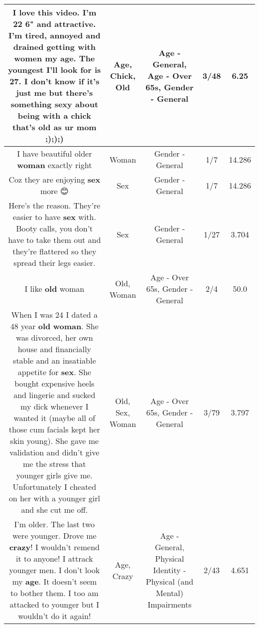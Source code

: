 \documentclass[11pt]{article}
\newlength\mylength
\begin{document}
\begin{center}
\begin{longtable}{|C{.65\mylength}|C{.30\mylength}|C{.12\mylength}|C{.12\mylength}|C{.12\mylength}|}
  \small I love this video. I'm 22 6" and attractive. I'm tired, annoyed and drained getting with women my \textbf{age}. The youngest I'll look for is 27. I don't know if it's just me but there's something sexy about being with a \textbf{chick} that's \textbf{old} as ur mom ;););)\normalsize   & Age, Chick, Old & Age - General, Age - Over 65s, Gender - General & 3/48 & 6.25 \\  \hline
  \small I have beautiful older \textbf{woman} exactly right\normalsize   & Woman & Gender - General & 1/7 & 14.286 \\  \hline
  \small Coz they are enjoying \textbf{sex} more 😊\normalsize   & Sex & Gender - General & 1/7 & 14.286 \\  \hline
  \small Here's the reason. They're easier to have \textbf{sex} with. Booty calls, you don't have to take them out and they're flattered so they  spread their legs easier.\normalsize   & Sex & Gender - General & 1/27 & 3.704 \\  \hline
  \small I like \textbf{old} woman\normalsize   & Old, Woman & Age - Over 65s, Gender - General & 2/4 & 50.0 \\  \hline
  \small When I was 24 I dated a 48 year \textbf{old} \textbf{woman}. She was divorced, her own house and financially stable and an insatiable appetite for \textbf{sex}. She bought expensive heels and lingerie and sucked my dick whenever I wanted it (maybe all of those cum facials kept her skin young). She gave me validation and didn't give me the stress that younger girls give me. Unfortunately I cheated on her with a younger girl and she cut me off.\normalsize   & Old, Sex, Woman & Age - Over 65s, Gender - General & 3/79 & 3.797 \\  \hline
  \small I'm older. The last two were younger. Drove me \textbf{crazy}! I wouldn't remend it to anyone! I attrack younger men. I don't look my \textbf{age}. It doesn't seem to bother them. I too am attacked to younger but I wouldn't do it again!\normalsize   & Age, Crazy & Age - General, Physical Identity - Physical (and Mental) Impairments & 2/43 & 4.651 \\  \hline

\end{longtable}
\end{center}
\end{document}
